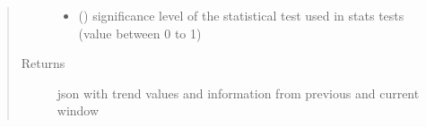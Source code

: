 \documentclass[letterpaper,10pt,english]{sphinxmanual}
\begin{document}
\begin{fulllineitems}
\begin{quote}
\begin{description}
\begin{itemize}
\item {} 
\sphinxAtStartPar
{} () \textendash{} significance level of the statistical test used in stats tests (value between 0 to 1)

\end{itemize}

\item[{Returns}] \leavevmode
\sphinxAtStartPar
json with trend values and information from previous and current window

\end{description}\end{quote}

\end{fulllineitems}

\end{document}
